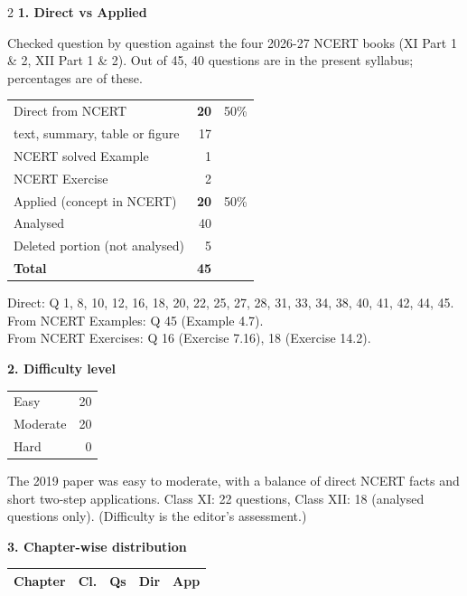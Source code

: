 \begin{multicols}{2}
\textbf{\color{crimson}1. Direct vs Applied}\par\smallskip
{\footnotesize Checked question by question against the four 2026-27 NCERT books (XI Part 1 \& 2, XII Part 1 \& 2). Out of 45, 40 questions are in the present syllabus; percentages are of these.}\par\smallskip
\begin{tabular}{@{}lrr@{}}\toprule
Direct from NCERT & \textbf{20} & 50\%\\
\quad text, summary, table or figure & 17 &\\
\quad NCERT solved Example & 1 &\\
\quad NCERT Exercise & 2 &\\
Applied (concept in NCERT) & \textbf{20} & 50\%\\\midrule
Analysed & 40 &\\
Deleted portion (not analysed) & 5 &\\\midrule
\textbf{Total} & \textbf{45} &\\\bottomrule\end{tabular}\par\smallskip
{\footnotesize Direct: Q 1, 8, 10, 12, 16, 18, 20, 22, 25, 27, 28, 31, 33, 34, 38, 40, 41, 42, 44, 45.\\ From NCERT Examples: Q 45 (Example 4.7).\\ From NCERT Exercises: Q 16 (Exercise 7.16), 18 (Exercise 14.2).}\par\medskip
\textbf{\color{crimson}2. Difficulty level}\par\smallskip
\begin{tabular}{@{}lr@{}}\toprule
Easy & 20\\ Moderate & 20\\ Hard & 0\\\bottomrule\end{tabular}\par\smallskip
{\footnotesize The 2019 paper was easy to moderate, with a balance of direct NCERT facts and short two-step applications. Class XI: 22 questions, Class XII: 18 (analysed questions only). (Difficulty is the editor's assessment.)}\par\medskip
\columnbreak
\textbf{\color{crimson}3. Chapter-wise distribution}\par\smallskip
{\footnotesize\begin{tabular}{@{}p{4.7cm}c@{\,}r@{\,}r@{\,}r@{}}\toprule
Chapter & Cl. & Qs & Dir & App\\\midrule

\end{tabular}}
\end{multicols}
